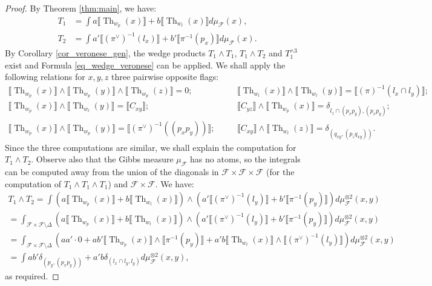 \documentclass[12pt]{amsbook}%
\theoremstyle{definition}
\theoremstyle{remark}
\numberwithin{section}{chapter}
\numberwithin{subsection}{section}
\numberwithin{figure}{chapter}
\DeclareMathOperator{\Th}{Th}
\newcommand\intcur[1]{\llbracket #1 \rrbracket}
\def\cF{{\mathscr{F}}}
\begin{document}
{{\begin{proof} By Theorem \ref{thm:main}, we have: 
\begin{align*}
T_1 & =  \int a \intcur{\Th_{w_p}(x)} + b \intcur{\Th_{w_l}(x)} d\mu_{\cF}(x), \\ 
T_2 &= \int a'  \intcur{(\pi^{\vee})^{-1}(l_x)} + b' \intcur{\pi^{-1}(p_x)} d\mu_{\cF}(x).
\end{align*}
By Corollary \ref{cor_veronese_gen}, the wedge products $T_1 \wedge T_1 $, $T_1 \wedge T_2$ and $T_1^{\wedge 3}$ exist and Formula \eqref{eq_wedge_veronese} can be applied. 
We shall apply the following relations for $x, y,z$ three pairwise opposite flags:
\begin{align*}
\intcur{\Th_{w_p}(x)} \wedge \intcur{\Th_{w_p}(y)} \wedge \intcur{\Th_{w_p}(z)} = 0 ;  &  \quad & \intcur{\Th_{w_l}(x)} \wedge \intcur{\Th_{w_l}(y)} = \intcur{(\pi)^{-1}(l_x \cap  l_y)} ;  \\
\intcur{\Th_{w_p}(x)} \wedge \intcur{\Th_{w_l}(y)} = \intcur{C_{xy}}  ; & \quad & \intcur{C_{yz}} \wedge \intcur{\Th_{w_p}(x)} = \delta_{l_z \cap (p_x p_y), (p_x p_y)} ;  \\
\intcur{\Th_{w_p}(x)} \wedge \intcur{\Th_{w_p}(y)} = \intcur{(\pi^{\vee})^{-1}((p_x p_y))} ;  & \quad & \intcur{C_{xy}} \wedge \intcur{\Th_{w_l}(z)} = \delta_{(q_{xy}, (p_z q_{xy}))}.   
\end{align*}
Since the three computations are similar, we shall explain the computation for $T_1 \wedge T_2$. 
Observe also that the Gibbs measure $\mu_{\cF}$ has no atoms, so the integrals can be computed away from the union of the diagonals in $\cF \times \cF \times \cF$ (for the computation of $T_1\wedge T_1 \wedge T_1$) and $\cF \times \cF$. 
We have: 
\begin{multline*}
T_1 \wedge T_2 = \int (a \intcur{\Th_{w_p}(x)} + b \intcur{\Th_{w_l}(x)}) \wedge (a'  \intcur{(\pi^{\vee})^{-1}(l_y)} + b' \intcur{\pi^{-1}(p_y)}) d \mu_{\cF}^{\otimes 2}(x,y) \\ 
= \int_{\cF \times \cF \setminus \Delta} (a \intcur{\Th_{w_p}(x)} + b \intcur{\Th_{w_l}(x)}) \wedge (a'  \intcur{(\pi^{\vee})^{-1}(l_y)} + b' \intcur{\pi^{-1}(p_y)}) d \mu_{\cF}^{\otimes 2}(x,y) \\
= \int_{\cF \times \cF \setminus \Delta }  (a a' \cdot 0 + a b' \intcur{\Th_{w_p}(x)} \wedge \intcur{\pi^{-1}(p_y)} + a' b \intcur{\Th_{w_l}(x)} \wedge \intcur{(\pi^{\vee})^{-1}(l_y)}  ) d\mu_{\cF}^{\otimes 2}(x,y) \\
 = \int a b' \delta_{(p_y,(p_x p_y))} + a' b \delta_{(l_x \cap l_y,l_y)} d\mu_{\cF}^{\otimes 2}(x,y),
\end{multline*}
as required.
\end{proof}

}}
\end{document}
